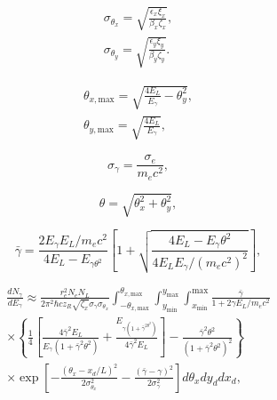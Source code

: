 \documentclass[../main.tex]{subfiles}
\begin{document}
\begin{gather}
\sigma_{\theta_{x}} = \sqrt{\frac{\epsilon_{x}\xi_{x}}{\beta_{x}\zeta_{x}}}, \\
\sigma_{\theta_{y}} = \sqrt{\frac{\epsilon_{y}\xi_{y}}{\beta_{y}\zeta_{y}}}.
\label{eq:sigmatheta_parameters_sun}
\end{gather}

\begin{gather}
\theta_{x,\mathrm{max}} = \sqrt{\frac{4E_{L}}{E_{\gamma}}-\theta_{y}^{2}}, \\
\theta_{y,\mathrm{max}} = \sqrt{\frac{4E_{L}}{E_{\gamma}}},
\label{eq:theta_max_parameter_sun}
\end{gather}

\begin{equation}
\sigma_{\gamma} = \frac{\sigma_{e}}{m_{e}c^{2}},
\label{eq:gamma_energy_spread}
\end{equation}

\begin{equation}
\theta = \sqrt{\theta_{x}^{2}+\theta_{y}^{2}},
\label{eq:theta_angle_sun}
\end{equation}

\begin{equation}
\bar{\gamma} = \frac{2E_{\gamma}E_{L}/m_{e}c^{2}}{4E_{L}-E_{\gamma\theta^{2}}}\left[1+\sqrt{\frac{4E_{L}-E_{\gamma}\theta^{2}}{4E_{L}E_{\gamma}/\left(m_{e}c^{2}\right)^{2}}}\right],  
\label{eq:gamma_bar_sun}
\end{equation}

\begin{multline}
\frac{dN_{\gamma}}{dE_{\gamma}} \approx \frac{r_{e}^{2}N_{e}N_{L}}{2\pi^{2}\hbar c z_{R}\sqrt{\zeta_{x}}\sigma_{\gamma}\sigma_{\theta_{x}}}\int_{-\theta_{x,\mathrm{max}}}^{\theta_{x,\mathrm{max}}}\int_{y_{\mathrm{min}}}^{y_{\mathrm{max}}}\int_{x_{\mathrm{min}}}^{\mathrm{max}}\frac{\bar{\gamma}}{1+2\gamma E_{L}/m_{e}c^{2}} \\
\times\left\{\frac{1}{4}\left[\frac{4\bar{\gamma}^{2}E_{L}}{E_{\gamma}\left(1+\bar{\gamma}^{2}\theta^{2}\right)}+\frac{E_{\gamma\left(1+\bar{\gamma}^{2\theta^{2}}\right)}}{4\bar{\gamma}^{2}E_{L}}\right]-\frac{\bar{\gamma}^{2}\theta^{2}}{\left(1+\bar{\gamma}^{2}\theta^{2}\right)^{2}}\right\} \\
\times\exp{\left[-\frac{\left(\theta_{x}-x_{d}/L\right)^{2}}{2\sigma_{\theta_{x}}^{2}}-\frac{\left(\bar{\gamma}-\gamma\right)^{2}}{2\sigma_{\gamma}^{2}}\right]}d\theta_{x}dy_{d}dx_{d},
\label{eq:1D_sun_equation}    
\end{multline}
    
\end{document}

